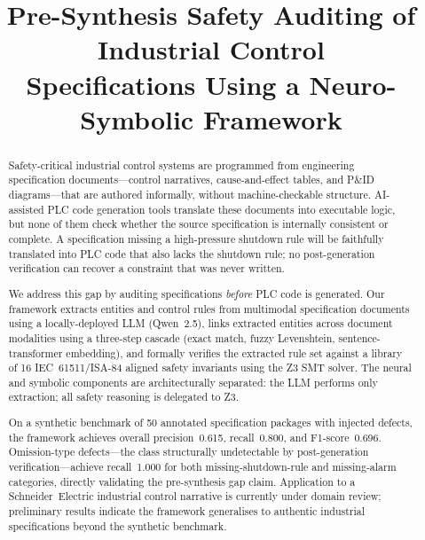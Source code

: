 \documentclass[conference]{IEEEtran}
\begin{document}
\title{Pre-Synthesis Safety Auditing of Industrial Control\\
Specifications Using a Neuro-Symbolic Framework}

\author{
  \and
}

\maketitle

\begin{abstract}
Safety-critical industrial control systems are programmed from engineering
specification documents---control narratives, cause-and-effect tables, and
P\&ID diagrams---that are authored informally, without machine-checkable
structure. AI-assisted PLC code generation tools translate these documents
into executable logic, but none of them check whether the source specification
is internally consistent or complete. A specification missing a high-pressure
shutdown rule will be faithfully translated into PLC code that also lacks the
shutdown rule; no post-generation verification can recover a constraint that
was never written.

We address this gap by auditing specifications \emph{before} PLC code is
generated. Our framework extracts entities and control rules from multimodal
specification documents using a locally-deployed LLM (Qwen~2.5), links
extracted entities across document modalities using a three-step cascade
(exact match, fuzzy Levenshtein, sentence-transformer embedding), and
formally verifies the extracted rule set against a library of 16
IEC~61511/ISA-84 aligned safety invariants using the Z3 SMT solver.
The neural and symbolic components are architecturally separated: the LLM
performs only extraction; all safety reasoning is delegated to Z3.

On a synthetic benchmark of 50 annotated specification packages
with injected defects, the framework achieves overall precision~0.615,
recall~0.800, and F1-score~0.696. Omission-type defects---the class
structurally undetectable by post-generation verification---achieve
recall~1.000 for both missing-shutdown-rule and missing-alarm categories,
directly validating the pre-synthesis gap claim. Application to a
Schneider~Electric industrial control narrative is currently under
domain review; preliminary results indicate the framework generalises
to authentic industrial specifications beyond the synthetic benchmark.
\end{abstract}
\end{document}
